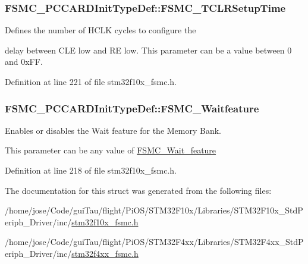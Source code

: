 \hypertarget{struct_f_s_m_c___p_c_c_a_r_d_init_type_def_a15db9675791f6f9c7fd82fe1084ff694}{
\subsubsection[{F\-S\-M\-C\-\_\-\-T\-C\-L\-R\-Setup\-Time}]{ F\-S\-M\-C\-\_\-\-P\-C\-C\-A\-R\-D\-Init\-Type\-Def\-::\-F\-S\-M\-C\-\_\-\-T\-C\-L\-R\-Setup\-Time}}\label{struct_f_s_m_c___p_c_c_a_r_d_init_type_def_a15db9675791f6f9c7fd82fe1084ff694}
\begin{DoxyVerb}  Defines the number of HCLK cycles to configure the
\end{DoxyVerb}
 delay between C\-L\-E low and R\-E low. This parameter can be a value between 0 and 0x\-F\-F. 

Definition at line 221 of file stm32f10x\-\_\-fsmc.\-h.

\hypertarget{struct_f_s_m_c___p_c_c_a_r_d_init_type_def_a3ffd8c627ffe3ac90dfbfe93a8b97c26}{
\subsubsection[{F\-S\-M\-C\-\_\-\-Waitfeature}]{ F\-S\-M\-C\-\_\-\-P\-C\-C\-A\-R\-D\-Init\-Type\-Def\-::\-F\-S\-M\-C\-\_\-\-Waitfeature}}\label{struct_f_s_m_c___p_c_c_a_r_d_init_type_def_a3ffd8c627ffe3ac90dfbfe93a8b97c26}
\begin{DoxyVerb}     Enables or disables the Wait feature for the Memory Bank.
\end{DoxyVerb}
 This parameter can be any value of \hyperlink{group___f_s_m_c___wait__feature}{F\-S\-M\-C\-\_\-\-Wait\-\_\-feature} 

Definition at line 218 of file stm32f10x\-\_\-fsmc.\-h.



The documentation for this struct was generated from the following files\-:\begin{DoxyCompactItemize}
\item 
/home/jose/\-Code/gui\-Tau/flight/\-Pi\-O\-S/\-S\-T\-M32\-F10x/\-Libraries/\-S\-T\-M32\-F10x\-\_\-\-Std\-Periph\-\_\-\-Driver/inc/\hyperlink{stm32f10x__fsmc_8h}{stm32f10x\-\_\-fsmc.\-h}\item 
/home/jose/\-Code/gui\-Tau/flight/\-Pi\-O\-S/\-S\-T\-M32\-F4xx/\-Libraries/\-S\-T\-M32\-F4xx\-\_\-\-Std\-Periph\-\_\-\-Driver/inc/\hyperlink{stm32f4xx__fsmc_8h}{stm32f4xx\-\_\-fsmc.\-h}\end{DoxyCompactItemize}
